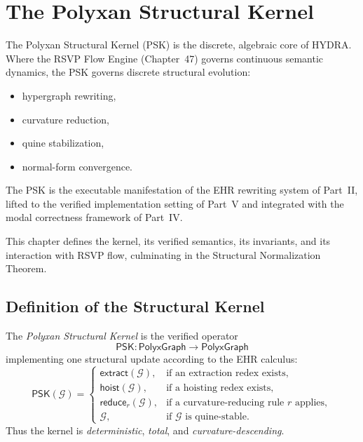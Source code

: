 \chapter{The Polyxan Structural Kernel}
\label{ch:48}

The Polyxan Structural Kernel (PSK) is the discrete, algebraic core of HYDRA.
Where the RSVP Flow Engine (Chapter~47) governs continuous semantic dynamics, the PSK governs discrete structural evolution:
\begin{itemize}
    \item hypergraph rewriting,
    \item curvature reduction,
    \item quine stabilization,
    \item normal-form convergence.
\end{itemize}

The PSK is the executable manifestation of the EHR rewriting system of Part~II, lifted to the verified implementation setting of Part~V and integrated with the modal correctness framework of Part~IV.

This chapter defines the kernel, its verified semantics, its invariants, and its interaction with RSVP flow, culminating in the Structural Normalization Theorem.

\section{Definition of the Structural Kernel}

\begin{definition}\label{def:PSK}
The \emph{Polyxan Structural Kernel} is the verified operator
\[
\mathsf{PSK} : \mathsf{PolyxGraph} \longrightarrow \mathsf{PolyxGraph}
\]
implementing one structural update according to the EHR calculus:
\[
\mathsf{PSK}(\mathcal{G}) =
\begin{cases}
\mathsf{extract}(\mathcal{G}), & \text{if an extraction redex exists},\\[4pt]
\mathsf{hoist}(\mathcal{G}),    & \text{if a hoisting redex exists},\\[4pt]
\mathsf{reduce}_r(\mathcal{G}), & \text{if a curvature-reducing rule $r$ applies},\\[4pt]
\mathcal{G},                    & \text{if $\mathcal{G}$ is quine-stable}.
\end{cases}
\]
Thus the kernel is \emph{deterministic}, \emph{total}, and \emph{curvature-descending}.
\end{definition}

